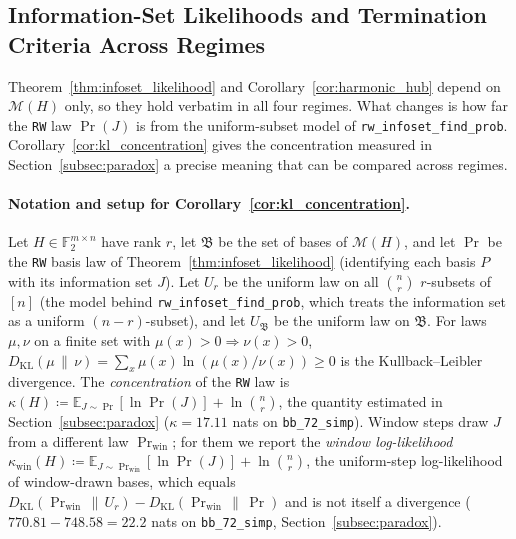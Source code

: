 \documentclass[12pt]{article}
\theoremstyle{definition}
\newcommand{\Ftwo}{\mathbb{F}_2}
\newcommand{\E}{\mathbb{E}}
\newcommand{\ttt}[1]{\texttt{#1}}
\begin{document}
\subsection{Information-Set Likelihoods and Termination Criteria Across Regimes}\label{subsec:pr_regimes}

Theorem~\ref{thm:infoset_likelihood} and Corollary~\ref{cor:harmonic_hub} depend on $\mathcal{M}(H)$ only, so they hold
verbatim in all four regimes. What changes is how far the \ttt{RW} law $\Pr(J)$ is from the uniform-subset model of
\ttt{rw\_infoset\_find\_prob}. Corollary~\ref{cor:kl_concentration} gives the concentration measured in
Section~\ref{subsec:paradox} a precise meaning that can be compared across regimes.

\paragraph{Notation and setup for Corollary~\ref{cor:kl_concentration}.}
Let $H \in \Ftwo^{m \times n}$ have rank $r$, let $\mathfrak{B}$ be the set of bases of $\mathcal{M}(H)$, and let
$\Pr$ be the \ttt{RW} basis law of Theorem~\ref{thm:infoset_likelihood} (identifying each basis $P$ with its
information set $J$). Let $U_r$ be the uniform law on all $\binom{n}{r}$ $r$-subsets of $[n]$ (the model behind
\ttt{rw\_infoset\_find\_prob}, which treats the information set as a uniform $(n - r)$-subset), and let
$U_{\mathfrak{B}}$ be the uniform law on $\mathfrak{B}$. For laws $\mu, \nu$ on a finite set with $\mu(x) > 0
\Rightarrow \nu(x) > 0$, $D_{\mathrm{KL}}(\mu \,\|\, \nu) = \sum_x \mu(x) \ln(\mu(x) / \nu(x)) \ge 0$ is the
Kullback--Leibler divergence. The \emph{concentration} of the \ttt{RW} law is $\kappa(H) \coloneqq \E_{J \sim
\Pr}[\ln \Pr(J)] + \ln\binom{n}{r}$, the quantity estimated in Section~\ref{subsec:paradox} ($\kappa = 17.11$ nats on
\ttt{bb\_72\_simp}). Window steps draw $J$ from a different law $\Pr_{\mathrm{win}}$; for them we report the
\emph{window log-likelihood} $\kappa_{\mathrm{win}}(H) \coloneqq \E_{J \sim \Pr_{\mathrm{win}}}[\ln \Pr(J)] +
\ln\binom{n}{r}$, the uniform-step log-likelihood of window-drawn bases, which equals
$D_{\mathrm{KL}}(\Pr_{\mathrm{win}} \,\|\, U_r) - D_{\mathrm{KL}}(\Pr_{\mathrm{win}} \,\|\, \Pr)$ and is not itself a
divergence ($770.81 - 748.58 = 22.2$
nats on \ttt{bb\_72\_simp}, Section~\ref{subsec:paradox}).
\end{document}
